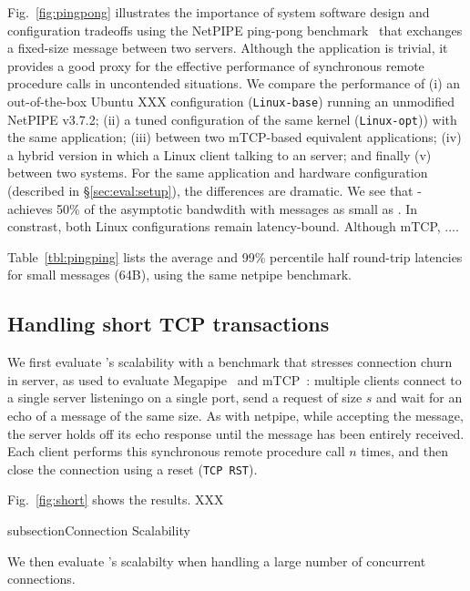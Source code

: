 Fig.~\ref{fig:pingpong} illustrates the importance of system software
design and configuration tradeoffs using the NetPIPE ping-pong
benchmark~\cite{snell1996netpipe} that exchanges a fixed-size message
between two servers.  Although the application is trivial, it provides
a good proxy for the effective performance of synchronous remote
procedure calls in uncontended situations.  We compare the performance
of (i) an out-of-the-box Ubuntu XXX configuration
(\texttt{Linux-base}) running an unmodified NetPIPE v3.7.2; (ii) a
tuned configuration of the same kernel (\texttt{Linux-opt})) with the
same application; (iii) between two mTCP-based equivalent
applications; (iv) a hybrid version in which a Linux client talking to
an \ix server; and finally (v) between two \ix systems.  For the same
application and hardware configuration (described in
\S\ref{sec:eval:setup}), the differences are dramatic.  We see that
\ix-\ix achieves 50\% of the asymptotic bandwdith with messages as small
as .  In constrast, both Linux configurations remain
latency-bound.  Although mTCP, ....


Table~\ref{tbl:pingping} lists the average and 99\% percentile half
round-trip latencies for small messages (64B), using the same netpipe
benchmark.  

\subsection{Handling short TCP transactions}



We first evaluate \ix's scalability with a benchmark that stresses
connection churn in server, as used to evaluate
Megapipe~\cite{han2012megapipe} and mTCP~\cite{jeong2014mtcp}:
multiple clients connect to a single server listeningo on a single
port, send a request of size $s$ and wait for an echo of a message of
the same size.  As with netpipe, while accepting the message, the server holds off its
echo response until the message has been entirely received.
Each client performs this synchronous remote procedure
call $n$ times, and then close the connection using a reset
(\texttt{TCP RST}).

Fig.~\ref{fig:short} shows the results. XXX


subsection{Connection Scalability}



We then evaluate \ix's scalabilty when handling a large number of concurrent connections. 

